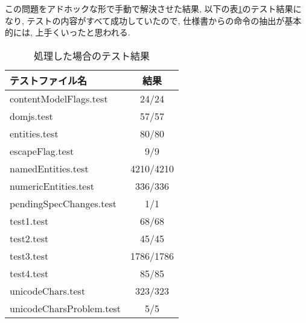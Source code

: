 \documentclass[uplatex,a4j]{jsreport}
\begin{document}



この問題をアドホックな形で手動で解決させた結果, 以下の表\ref{Consumeの処理}のテスト結果になり, テストの内容がすべて成功していたので, 
仕様書からの命令の抽出が基本的には, 上手くいったと思われる. 
\begin{table}[htb]
  \begin{center}
    \label{Consumeの処理}
    \caption{処理した場合のテスト結果}
    \begin{tabular}{|l|c|} \hline
      テストファイル名 & 結果 \\ \hline 
      contentModelFlags.test & 24/24  \\
      domjs.test & 57/57  \\
      entities.test & 80/80 \\
      escapeFlag.test & 9/9 \\
      namedEntities.test & 4210/4210 \\
      numericEntities.test & 336/336 \\
      pendingSpecChanges.test & 1/1 \\
      test1.test & 68/68  \\
      test2.test & 45/45 \\
      test3.test & 1786/1786 \\
      test4.test & 85/85 \\ 
      unicodeChars.test & 323/323 \\
      unicodeCharsProblem.test & 5/5 \\ \hline 
    \end{tabular}
  \end{center}
\end{table}

\end{document}
